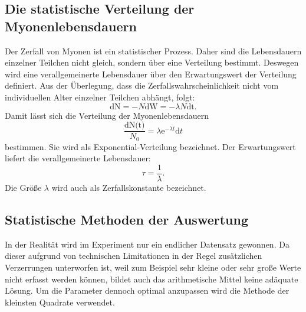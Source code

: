 \subsection{Die statistische Verteilung der Myonenlebensdauern}
Der Zerfall von Myonen ist ein statistischer Prozess. Daher sind die Lebensdauern einzelner Teilchen nicht gleich, sondern über eine Verteilung bestimmt. Deswegen wird eine verallgemeinerte Lebensdauer über den Erwartungswert der Verteilung definiert. Aus der Überlegung, dass die Zerfallswahrscheinlichkeit nicht vom individuellen Alter einzelner Teilchen abhängt, folgt:
\begin{equation}
    \text{dN} = -N \text{dW} = - \lambda N \text{dt} \text{.} \label{eq:stat}
\end{equation}
Damit lässt sich die Verteilung der Myonenlebensdauern
\begin{equation}
    \frac{\text{dN(t)}}{N_0} = \lambda \text{e}^{-\lambda t} \text{d}t  \label{eq:stat2}
\end{equation}
bestimmen.
Sie wird als Exponential-Verteilung bezeichnet. Der Erwartungswert liefert die verallgemeinerte Lebensdauer:
\begin{equation}
    \tau = \frac{1}{\lambda}\text{.} \label{eq:stat3}
\end{equation}
Die Größe $\lambda$ wird auch als Zerfallskonstante bezeichnet.

\subsection{Statistische Methoden der Auswertung}
In der Realität wird im Experiment nur ein endlicher Datensatz gewonnen. Da dieser aufgrund von technischen Limitationen in der Regel zusätzlichen Verzerrungen unterworfen ist, weil zum Beispiel sehr kleine oder sehr große Werte nicht erfasst werden können, bildet auch das arithmetische Mittel keine adäquate Lösung. Um die Parameter dennoch optimal anzupassen wird die Methode der kleinsten Quadrate verwendet.